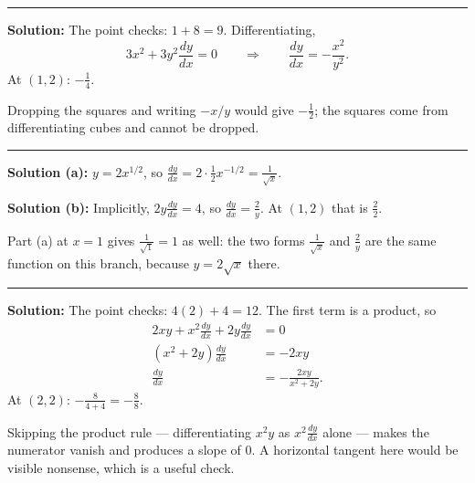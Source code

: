 \documentclass[12pt]{article}
\begin{document}
\vspace{0.15cm}\noindent\rule{\linewidth}{0.2pt}\vspace{0.15cm}


\textbf{Solution:} The point checks: $1 + 8 = 9$. Differentiating,
\[
  3x^2 + 3y^2\frac{dy}{dx} = 0 \qquad\Longrightarrow\qquad
  \frac{dy}{dx} = -\frac{x^2}{y^2} .
\]
At $(1,2)$: $-\frac{1}{4}$. 

Dropping the squares and writing $-x/y$ would give $-\frac{1}{2}$; the squares
come from differentiating cubes and cannot be dropped.

\vspace{0.15cm}\noindent\rule{\linewidth}{0.2pt}\vspace{0.15cm}


\textbf{Solution (a):} $y = 2x^{1/2}$, so
$\frac{dy}{dx} = 2 \cdot \tfrac{1}{2}x^{-1/2} = \frac{1}{\sqrt{x}}$.

\textbf{Solution (b):} Implicitly, $2y\frac{dy}{dx} = 4$, so
$\frac{dy}{dx} = \frac{2}{y}$. At $(1,2)$ that is $\frac{2}{2}$. 

Part (a) at $x = 1$ gives $\frac{1}{\sqrt{1}} = 1$ as well: the two forms
$\frac{1}{\sqrt{x}}$ and $\frac{2}{y}$ are the same function on this branch,
because $y = 2\sqrt{x}$ there.

\vspace{0.15cm}\noindent\rule{\linewidth}{0.2pt}\vspace{0.15cm}


\textbf{Solution:} The point checks: $4(2) + 4 = 12$. The first term is a
product, so
\begin{align*}
  2xy + x^2\frac{dy}{dx} + 2y\frac{dy}{dx} &= 0 \\
  \left(x^2 + 2y\right)\frac{dy}{dx} &= -2xy \\
  \frac{dy}{dx} &= -\frac{2xy}{x^2 + 2y} .
\end{align*}
At $(2,2)$: $-\frac{8}{4+4} = -\frac{8}{8}$. 

Skipping the product rule --- differentiating $x^2y$ as $x^2\frac{dy}{dx}$ alone
--- makes the numerator vanish and produces a slope of $0$. A horizontal tangent
here would be visible nonsense, which is a useful check.
\end{document}
